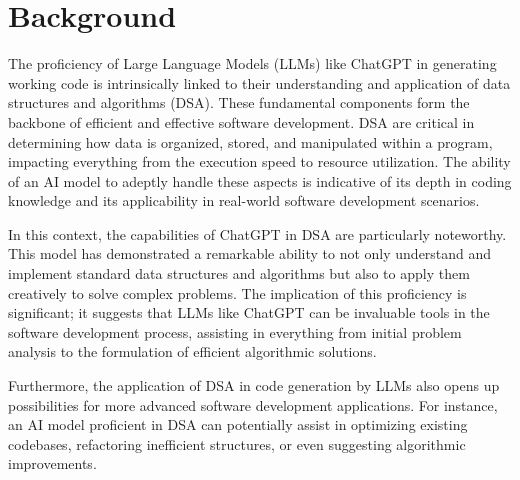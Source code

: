 
\section{Background}
\label{sec:into_back}



The proficiency of Large Language Models (LLMs) like ChatGPT in generating working code is intrinsically linked to their understanding and application of data structures and algorithms (DSA). These fundamental components form the backbone of efficient and effective software development. DSA are critical in determining how data is organized, stored, and manipulated within a program, impacting everything from the execution speed to resource utilization. The ability of an AI model to adeptly handle these aspects is indicative of its depth in coding knowledge and its applicability in real-world software development scenarios.

In this context, the capabilities of ChatGPT in DSA are particularly noteworthy. This model has demonstrated a remarkable ability to not only understand and implement standard data structures and algorithms but also to apply them creatively to solve complex problems. The implication of this proficiency is significant; it suggests that LLMs like ChatGPT can be invaluable tools in the software development process, assisting in everything from initial problem analysis to the formulation of efficient algorithmic solutions.

Furthermore, the application of DSA in code generation by LLMs also opens up possibilities for more advanced software development applications. For instance, an AI model proficient in DSA can potentially assist in optimizing existing codebases, refactoring inefficient structures, or even suggesting algorithmic improvements. 

